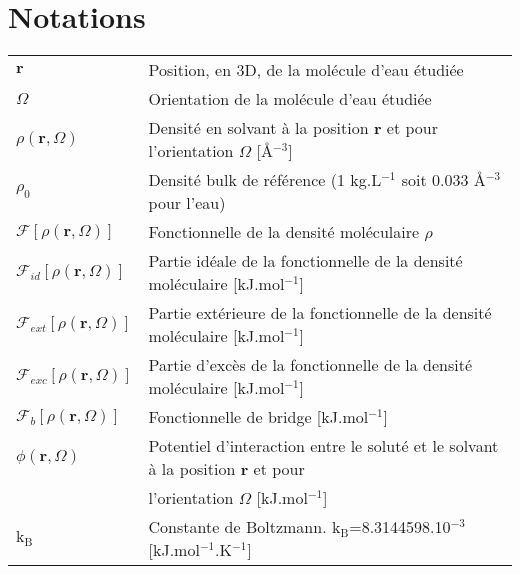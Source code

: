 \documentclass{bredele}
\begin{document}
\clearemptydoublepage



\renewcommand\contentsname{Sommaire}
\tableofcontents
 
 
\renewcommand{\cftdotsep}{\cftnodots}
\cleardoublepage
\listoffigures
\cleardoublepage
\listoftables


\clearemptydoublepage
\section*{Notations}

\begin{tabular}{l l}
$\boldsymbol{r}$ & Position, en 3D, de la molécule d'eau étudiée \\
$\Omega$ & Orientation de la molécule d'eau étudiée \\
$\rho\left(\boldsymbol{r},\Omega \right)$ & Densité en solvant à la position $\boldsymbol{r}$ et pour l'orientation $\Omega$ [\AA$^{-3}$]  \\  
$\rho_0$ & Densité bulk de référence (1 kg.L$^{-1}$ soit 0.033 \AA$^{-3}$ pour l'eau) \\
$\mathcal{F}[\rho\left(\boldsymbol{r},\Omega \right)]$ & Fonctionnelle de la densité moléculaire $\rho$ \\
$\mathcal{F}_{id}[\rho\left(\boldsymbol{r},\Omega \right)]$ & Partie idéale de la fonctionnelle de la densité moléculaire [kJ.mol$^{-1}$]\\
$\mathcal{F}_{ext}[\rho\left(\boldsymbol{r},\Omega \right)]$ & Partie extérieure de la fonctionnelle de la densité moléculaire  [kJ.mol$^{-1}$]\\
$\mathcal{F}_{exc}[\rho\left(\boldsymbol{r},\Omega \right)]$ & Partie d'excès de la fonctionnelle de la densité moléculaire [kJ.mol$^{-1}$]\\
$\mathcal{F}_{b}[\rho\left(\boldsymbol{r},\Omega \right)]$ & Fonctionnelle de bridge [kJ.mol$^{-1}$]\\
$\phi\left(\boldsymbol{r},\Omega \right)$ & Potentiel d'interaction entre le soluté et le solvant à la position $\boldsymbol{r}$ et pour \\
 & l'orientation $\Omega$ [kJ.mol$^{-1}$]\\
$\mathrm{k_B}$ & Constante de Boltzmann. $\mathrm{k_B}$=8.3144598.10$^{-3}$ [kJ.mol$^{-1}$.K$^{-1}$]\\

\end{tabular}
\end{document}
